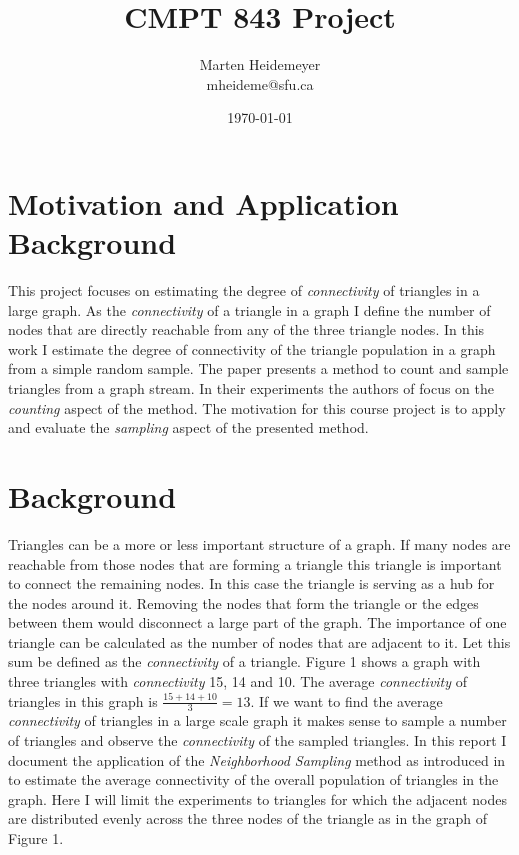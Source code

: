 \documentclass[12pt,twoside,a4paper]{report}
\title{CMPT 843 Project}
\author{Marten Heidemeyer\\mheideme@sfu.ca}
\date{\today}
\begin{document}
\maketitle
\section{Motivation and Application Background}
This project focuses on estimating the degree of \textit{connectivity} of triangles in a large graph. As the \textit{connectivity} of a triangle in a graph I define the number of nodes that are directly reachable from any of the three triangle nodes. In this work I estimate the degree of connectivity of the triangle population in a graph from a simple random sample. The paper \cite{countsample} presents a method to count and sample triangles from a graph stream. In their experiments the authors of \cite{countsample} focus on the \textit{counting} aspect of the method. The motivation for this course project is to apply and evaluate the \textit{sampling} aspect of the presented method.
\section{Background}
Triangles can be a more or less important structure of a graph. If many nodes are reachable from those nodes that are forming a triangle this triangle is important to connect the remaining nodes. In this case the triangle is serving as a hub for the nodes around it. Removing the nodes that form the triangle or the edges between them would disconnect a large part of the graph. The importance of one triangle can be calculated as the number of nodes that are adjacent to it. Let this sum be defined as the \textit{connectivity} of a triangle. Figure 1 shows a graph with three triangles with \textit{connectivity} 15, 14 and 10. The average \textit{connectivity} of triangles in this graph is $\frac{15+14+10}{3}=13$. If we want to find the average \textit{connectivity} of triangles in a large scale graph it makes sense to sample a number of triangles and observe the \textit{connectivity} of the sampled triangles. In this report I document the application of the \textit{Neighborhood Sampling} method as introduced in \cite{countsample} to estimate the average connectivity of the overall population of triangles in the graph. Here I will limit the experiments to triangles for which the adjacent nodes are distributed evenly across the three nodes of the triangle as in the graph of Figure 1.
 
\end{document}
